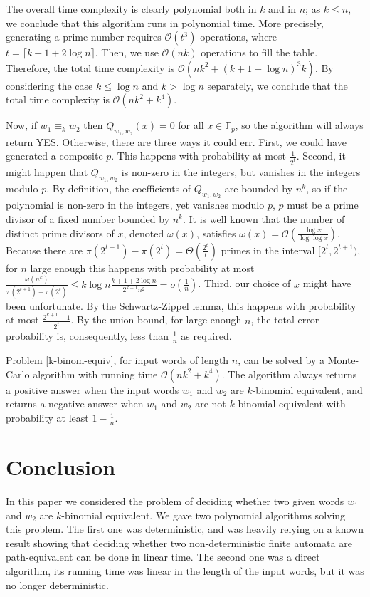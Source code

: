 \documentclass[runningheads]{llncs}
\newcommand{\bigo}{{\mathcal{O}}}
\begin{document}
The overall time complexity is clearly polynomial both in $k$ and in $n$; as $k\leq n$, we conclude that this algorithm runs in polynomial time. More precisely, generating a prime number requires $\bigo(t^{3})$ operations, where $t=\lceil k+1+2\log n\rceil$. Then, we use $\bigo(nk)$ operations to fill the table. Therefore, the total time complexity is $\bigo(nk^{2}+(k+1+\log n)^{3}k)$. By considering the case $k\leq \log n$ and $k>\log n$ separately, we conclude that the total time complexity is $\bigo(nk^{2}+k^{4})$.

Now, if $w_1\equiv_{k} w_2$ then $Q_{w_1,w_2}(x)=0$ for all $x\in \mathbb{F}_p$, so the algorithm will always return YES.
Otherwise, there are three ways it could err. First, we could have generated a composite $p$.
This happens with probability at most $\frac{1}{2^{t}}$.
Second, it might happen that $Q_{w_{1},w_{2}}$ is non-zero in the integers, but vanishes in the integers modulo $p$.
By definition, the coefficients of $Q_{w_{1},w_{2}}$ are bounded by $n^{k}$, so if the polynomial is non-zero in the integers, yet vanishes modulo $p$, $p$ must be a prime divisor of a fixed number bounded by $n^{k}$. It is well known that the number of distinct prime divisors of $x$, denoted $\omega(x)$, satisfies $\omega(x)=\bigo(\frac{\log x}{\log\log x})$. Because there are $\pi(2^{t+1})-\pi(2^{t})=\Theta(\frac{2^{t}}{t})$ primes in the interval $[2^{t},2^{t+1})$, for $n$ large enough this happens with probability at most $\frac{\omega(n^{k})}{\pi(2^{t+1})-\pi(2^{t})}\leq k\log n \frac{k+1+2\log n}{2^{k+1}n^{2}}=o(\frac{1}{n})$.
Third, our choice of $x$ might have been unfortunate. By the Schwartz-Zippel lemma,
this happens with probability at most $\frac{2^{k+1}-1}{2^{t}}$.
By the union bound, for large enough $n$, the total error probability is, consequently, less than $\frac{1}{n}$ as required.

\begin{theorem}
Problem \ref{k-binom-equiv}, for input words of length $n$, can be solved by a Monte-Carlo algorithm with running time $\bigo(nk^2+k^{4})$. The algorithm always returns a positive answer when the input words $w_1$ and $w_2$ are $k$-binomial equivalent, and returns a negative answer when $w_1$ and $w_2$ are not $k$-binomial equivalent with probability at least $1-\frac{1}{n}$.
\end{theorem}

\section{Conclusion}
In this paper we considered the problem of deciding whether two given words $w_1$ and $w_2$ are $k$-binomial equivalent. We gave two polynomial algorithms solving this problem. The first one was deterministic, and was heavily relying on a known result showing that deciding whether two non-deterministic finite automata are path-equivalent can be done in linear time. The second one was a direct algorithm, its running time was linear in the length of the input words, but it was no longer deterministic. 
\end{document}
